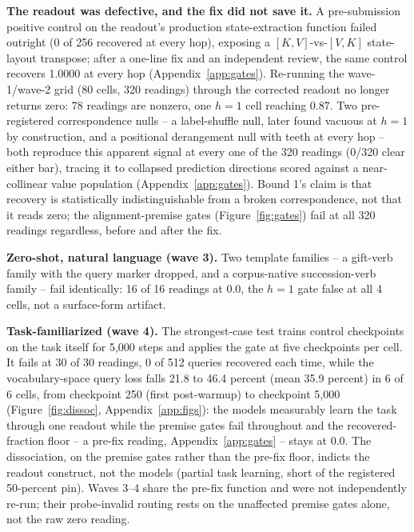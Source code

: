 \documentclass{article} %
\begin{document}
\textbf{The readout was defective, and the fix did not save it.} A
pre-submission positive control on the readout's production
state-extraction function failed outright (0 of 256 recovered at every
hop), exposing a $[K,V]$-vs-$[V,K]$ state-layout transpose; after a
one-line fix and an independent review, the same control recovers 1.0000
at every hop (Appendix~\ref{app:gates}). %
Re-running the wave-1/wave-2 grid (80 cells, 320 readings) through the
corrected readout no longer returns zero: 78 readings are nonzero, one
$h{=}1$ cell reaching 0.87. %
Two pre-registered correspondence nulls -- a label-shuffle null, later
found vacuous at $h{=}1$ by construction, and a positional derangement
null with teeth at every hop -- both reproduce this apparent signal at
every one of the 320 readings (0/320 clear either bar), tracing it to
collapsed prediction directions scored against a near-collinear value
population (Appendix~\ref{app:gates}). %
Bound 1's claim is that recovery is statistically indistinguishable from a
broken correspondence, not that it reads zero; the alignment-premise gates
(Figure~\ref{fig:gates}) fail at all 320 readings regardless, before and
after the fix. %

\textbf{Zero-shot, natural language (wave 3).} Two template families -- a
gift-verb family with the query marker dropped, and a corpus-native
succession-verb family -- fail identically: 16 of 16 readings at 0.0, the
$h{=}1$ gate false at all 4 cells, not a surface-form artifact.

\textbf{Task-familiarized (wave 4).} The strongest-case test trains
control checkpoints on the task itself for 5{,}000 steps and applies the
gate at five checkpoints per cell. It fails at 30 of 30 readings, 0 of 512
queries recovered each time, %
while the vocabulary-space query loss falls 21.8 to 46.4 percent (mean
35.9 percent) in 6 of 6 cells, from checkpoint 250 (first post-warmup) to
checkpoint 5{,}000 %
(Figure~\ref{fig:dissoc}, Appendix~\ref{app:figs}): the models measurably
learn the task through one readout while the premise gates fail
throughout and the recovered-fraction floor -- a pre-fix reading,
Appendix~\ref{app:gates} -- stays at 0.0. The dissociation, on the
premise gates rather than the pre-fix floor, indicts the readout
construct, not the models (partial task learning, short of the registered
50-percent pin). Waves 3--4 share the pre-fix function and were not
independently re-run; their probe-invalid routing rests on the unaffected
premise gates alone, not the raw zero reading.
\end{document}

